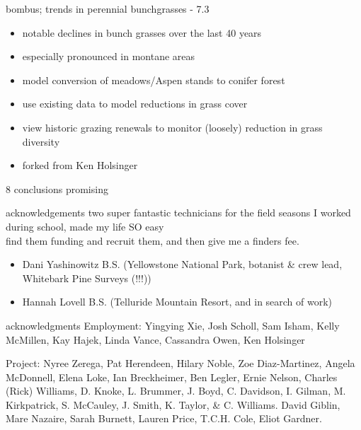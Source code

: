 \documentclass[
  ignorenonframetext,
]{beamer}
\providecommand{\tightlist}{%
  \setlength{\itemsep}{0pt}\setlength{\parskip}{0pt}}
\begin{document}
\begin{frame}{bombus; trends in perennial bunchgrasses - 7.3}
\protect\hypertarget{bombus-trends-in-perennial-bunchgrasses---7.3}{}
\begin{itemize}
\tightlist
\item
  notable declines in bunch grasses over the last 40 years
\item
  especially pronounced in montane areas
\item
  model conversion of meadows/Aspen stands to conifer forest
\item
  use existing data to model reductions in grass cover
\item
  view historic grazing renewals to monitor (loosely) reduction in grass
  diversity
\item
  forked from Ken Holsinger
\end{itemize}
\end{frame}

\begin{frame}{8 \textbar{} conclusions}
\protect\hypertarget{conclusions}{}
promising
\end{frame}

\begin{frame}{acknowledgements}
\protect\hypertarget{acknowledgements}{}
two super fantastic technicians for the field seasons I worked during
school, made my life SO easy\\
find them funding and recruit them, and then give me a finders fee.

\begin{itemize}
\tightlist
\item
  Dani Yashinowitz B.S. (Yellowstone National Park, botanist \& crew
  lead, Whitebark Pine Surveys (!!!))
\item
  Hannah Lovell B.S. (Telluride Mountain Resort, and in search of work)
\end{itemize}
\end{frame}

\begin{frame}{acknowledgments}
\protect\hypertarget{acknowledgments}{}
Employment: Yingying Xie, Josh Scholl, Sam Isham, Kelly McMillen, Kay
Hajek, Linda Vance, Cassandra Owen, Ken Holsinger

Project: Nyree Zerega, Pat Herendeen, Hilary Noble, Zoe Diaz-Martinez,
Angela McDonnell, Elena Loke, Ian Breckheimer, Ben Legler, Ernie Nelson,
Charles (Rick) Williams, D. Knoke, L. Brummer, J. Boyd, C. Davidson, I.
Gilman, M. Kirkpatrick, S. McCauley, J. Smith, K. Taylor, \& C.
Williams. David Giblin, Mare Nazaire, Sarah Burnett, Lauren Price,
T.C.H. Cole, Eliot Gardner.
\end{frame}
\end{document}
